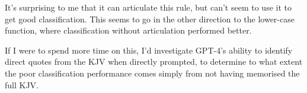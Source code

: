 \documentclass[a4paper, 11pt]{article}
\begin{document}
It's surprising to me that it can articulate this rule, but can't seem to use it to get good classification.
This seems to go in the other direction to the lower-case function, where classification without articulation performed better.

If I were to spend more time on this, I'd investigate GPT-4's ability to identify direct quotes from the KJV when directly prompted,
to determine to what extent the poor classification performance comes simply from not having memorised the full KJV.





\end{document}
